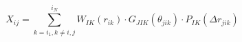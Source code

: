\documentclass[12pt]{article}
\begin{document}
$$
X_{ij}=\sum_{k=i_1,k\neq i,j}^{i_N}W_{IK}\left(r_{ik}\right)\cdot G_{JIK}\left(\theta_{jik}\right)\cdot P_{IK}\left(\Delta r_{jik}\right)
\label{X_eq2}
$$
\end{document}
